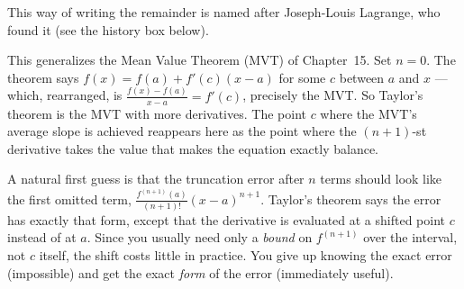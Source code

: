 This way of writing the remainder is named after Joseph-Louis Lagrange, who found it
(see the history box below).

This generalizes the Mean Value Theorem (MVT) of Chapter~15. Set $n=0$. The
theorem says $f(x) = f(a) + f'(c)(x-a)$ for some $c$ between $a$ and $x$ --- which,
rearranged, is $\frac{f(x)-f(a)}{x-a} = f'(c)$, precisely the MVT. So Taylor's
theorem is the MVT with more derivatives. The point $c$ where the MVT's average
slope is achieved reappears here as the point where the
$(n+1)$-st derivative takes the value that makes the equation exactly balance.

\begin{intuitionbox}
A natural first guess is that the truncation error after $n$ terms should look like
the first omitted term, $\frac{f^{(n+1)}(a)}{(n+1)!}(x-a)^{n+1}$.
Taylor's theorem says the error has exactly that form, except that the derivative is
evaluated at a shifted point $c$ instead of at $a$. Since you usually need only a
\emph{bound} on $f^{(n+1)}$ over the interval, not $c$ itself, the shift costs little
in practice. You give up knowing the exact error (impossible) and get the exact
\emph{form} of the error (immediately useful).
\end{intuitionbox}

